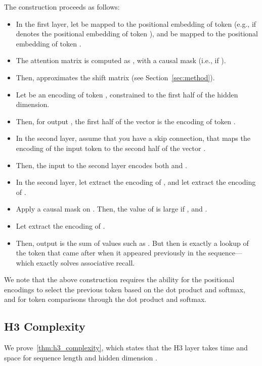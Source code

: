 \documentclass{article}
\newcommand{\hthree}{\textsc{H3}\xspace}
\begin{document}
The construction proceeds as follows:
\begin{itemize}
  \item In the first layer, let  be mapped to the positional embedding of token  (e.g.,  if  denotes the positional embedding of token ), and  be mapped to the positional embedding of token .
  \item The attention matrix  is computed as , with a causal mask (i.e.,  if ).
  \item Then,  approximates the shift matrix (see Section~\ref{sec:method}).
  \item Let  be an encoding of token , constrained to the first half of the hidden dimension.
  \item Then, for output , the first half of the vector  is the encoding of token .
  \item In the second layer, assume that you have a skip connection, that maps the encoding of the input token  to the second half of the vector .
  \item Then, the input to the second layer encodes both  and .
  \item In the second layer, let  extract the encoding of , and let  extract the encoding of .
  \item Apply a causal mask on . Then, the value of  is large if , and .
  \item Let  extract the encoding of .
  \item Then, output  is the sum of values  such as . But then  is exactly a lookup of the token that came after  when it appeared previously in the sequence---which exactly solves associative recall.
\end{itemize}

We note that the above construction requires the ability for the positional encodings to select the previous token based on the dot product and softmax, and for token comparisons through the dot product and softmax.

\subsection{\hthree Complexity}
\label{sec:app_h3_complexity}

We prove~\cref{thm:h3_complexity}, which states that the \hthree layer takes
 time and  space for sequence length  and hidden
dimension .
\end{document}
